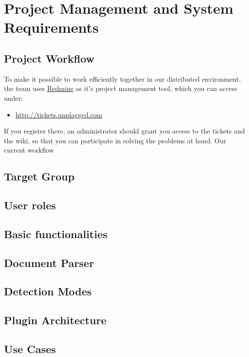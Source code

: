 \chapter{Project Management and System Requirements}\label{chap:systemRequirements}

\section{Project Workflow}\label{sec:workflow}

To make it possible to work efficiently together in our distributed environment, the team uses 
\href{http://www.redmine.org/}{Redmine} as it's project management tool, which you can access under:

\begin{itemize}
\item \url{http://tickets.unplagged.com}
\end{itemize}

If you register there, an administrator should grant you access to the tickets and the wiki, so that you can participate
in solving the problems at hand. Our current workflow 


\section{Target Group}

\section{User roles}

\section{Basic functionalities}

\section{Document Parser}

\section{Detection Modes}

\section{Plugin Architecture}

\section{Use Cases}
